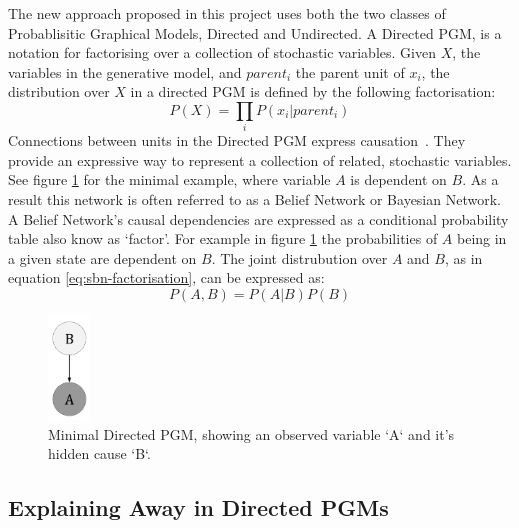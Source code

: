 The new approach proposed in this project uses both the two classes of Probablisitic Graphical Models, Directed and Undirected. A Directed PGM, is a notation for factorising over a collection of stochastic variables.
Given $X$, the variables in the generative model, and $parent_i$ the parent unit of $x_i$, the distribution over $X$ in a directed PGM is defined by the following factorisation:
\begin{equation}\label{eq:sbn-factorisation}
P(X) = \prod_i P(x_i | parent_i)
\end{equation}
Connections between units in the Directed PGM express causation~\cite{pearl2014probabilistic}. They provide an expressive way to represent a collection of related, stochastic variables. See figure \ref{F:PGM-example} for the minimal example, where variable $A$ is dependent on $B$. As a result this network is often referred to as a Belief Network or Bayesian Network. A Belief Network's causal dependencies are expressed as a conditional probability table also know as `factor'. For example in figure \ref{F:PGM-example} the probabilities of $A$ being in a given state are dependent on $B$. The joint distrubution over $A$ and $B$, as in equation \ref{eq:sbn-factorisation}, can be expressed as:
$$P(A,B) = P(A|B)P(B)$$
\begin{figure}
\begin{center}
  \includegraphics[width = 0.1\textwidth]{Assets/PGM_Example_1.png}
\caption{Minimal Directed PGM, showing an observed variable `A` and it's hidden cause `B`.}
\label{F:PGM-example}
\end{center}
\end{figure}

\subsection{Explaining Away in Directed PGMs}\label{S:Explaining-Away}

